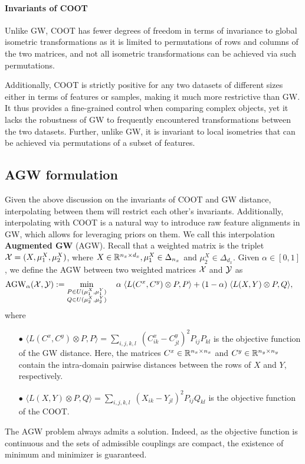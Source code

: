 \paragraph{Invariants of COOT} Unlike GW, COOT has fewer degrees of freedom
in terms of invariance to global isometric transformations as it is limited to
permutations of rows and columns of the two matrices, and not all isometric transformations
can be achieved via such permutations.

Additionally, COOT is strictly positive for any two datasets of different sizes either
in terms of features or samples, making it much more restrictive than GW.
It thus provides a fine-grained control when comparing complex objects,
yet it lacks the robustness of GW to frequently encountered transformations
between the two datasets. Further, unlike GW, it is invariant to local isometries
that can be achieved via permutations of a subset of features.

\subsection{AGW formulation} \label{subsec:agw_formulation}
Given the above discussion on the invariants of COOT and GW distance,
interpolating between them will restrict each other's invariants. Additionally,
interpolating with COOT is a natural way to introduce raw feature alignments in GW,
which allows for leveraging priors on them. We call this interpolation \textbf{Augmented GW} (AGW).
Recall that a weighted matrix is the triplet $\mathcal X = (X, \mu_1^X, \mu_2^X)$, where
$X \in \mathbb R^{n_x \times d_x}, \mu_1^X \in \Delta_{n_x}$ and $\mu_2^X \in \Delta_{d_x}$.
Given $\alpha \in [0,1]$, we define the AGW between two weighted matrices $\mathcal X$ and $\mathcal Y$ as
\begin{align}
\label{eq:scootr}
\text{AGW}_{\alpha}(\mathcal X, \mathcal Y) &:=
\min_{\substack{P \in U(\mu_1^X, \mu_1^Y) \\ Q \in U(\mu_2^X,\mu_2^Y)}} \quad
\alpha \; \langle L(C^x,C^y) \otimes P, P \rangle + (1-\alpha) \; \langle L(X,Y) \otimes P, Q \rangle,
\end{align}
where
\begin{itemize}
    \item[$\bullet$] $\langle L(C^x,C^y) \otimes P, P \rangle
    = \sum_{i,j,k,l} \; (C^x_{ik} - C^y_{jl})^2 P_{ij} P_{kl}$ is the objective function of
    the GW distance. Here, the matrices $C^x \in \mathbb R^{n_x \times n_x}$ and
    $C^y \in \mathbb R^{n_y \times n_y}$
    contain the intra-domain pairwise distances between the rows of $X$ and $Y$, respectively.

    \item[$\bullet$] $\langle L(X,Y) \otimes P, Q \rangle =
    \sum_{i,j,k,l} \; (X_{ik} - Y_{jl})^2 P_{ij} Q_{kl}$ is the objective function of the COOT.
\end{itemize}
The AGW problem always admits a solution. Indeed, as the objective function is continuous
and the sets of admissible couplings are compact, the existence of minimum and minimizer
is guaranteed.

